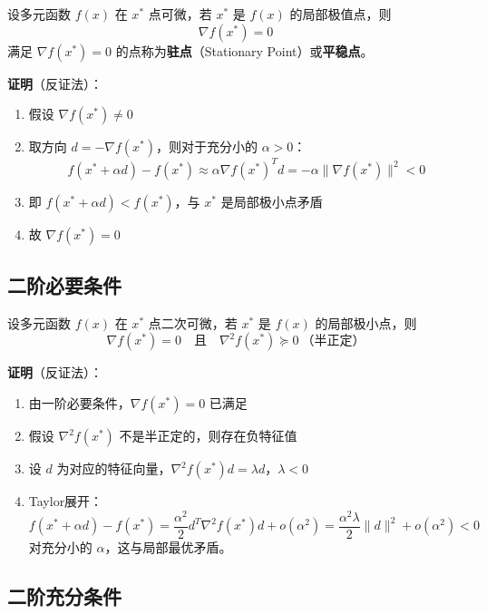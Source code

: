 \begin{theorem}[一阶必要条件]\label{thm:first-order}
设多元函数 $f(x)$ 在 $x^*$ 点可微，若 $x^*$ 是 $f(x)$ 的局部极值点，则
\[
\nabla f(x^*) = 0
\]
满足 $\nabla f(x^*) = 0$ 的点称为\textbf{驻点}（Stationary Point）或\textbf{平稳点}。
\end{theorem}

\textbf{证明}（反证法）：
\begin{enumerate}[label=Step \arabic*:, leftmargin=2em]
    \item 假设 $\nabla f(x^*) \neq 0$
    \item 取方向 $d = -\nabla f(x^*)$，则对于充分小的 $\alpha > 0$：
    \[
    f(x^* + \alpha d) - f(x^*) \approx \alpha \nabla f(x^*)^T d = -\alpha \|\nabla f(x^*)\|^2 < 0
    \]
    \item 即 $f(x^* + \alpha d) < f(x^*)$，与 $x^*$ 是局部极小点矛盾
    \item 故 $\nabla f(x^*) = 0$
\end{enumerate}

\subsection{二阶必要条件}

\begin{theorem}[二阶必要条件]\label{thm:second-order-necessary}
设多元函数 $f(x)$ 在 $x^*$ 点二次可微，若 $x^*$ 是 $f(x)$ 的局部极小点，则
\[
\nabla f(x^*) = 0 \quad \text{且} \quad \nabla^2 f(x^*) \succeq 0 \ \text{（半正定）}
\]
\end{theorem}

\textbf{证明}（反证法）：
\begin{enumerate}[label=Step \arabic*:, leftmargin=2em]
    \item 由一阶必要条件，$\nabla f(x^*) = 0$ 已满足
    \item 假设 $\nabla^2 f(x^*)$ 不是半正定的，则存在负特征值
    \item 设 $d$ 为对应的特征向量，$\nabla^2 f(x^*) d = \lambda d$，$\lambda < 0$
    \item Taylor展开：
    \[
    f(x^* + \alpha d) - f(x^*) = \frac{\alpha^2}{2} d^T \nabla^2 f(x^*) d + o(\alpha^2) = \frac{\alpha^2 \lambda}{2} \|d\|^2 + o(\alpha^2) < 0
    \]
    对充分小的 $\alpha$，这与局部最优矛盾。
\end{enumerate}

\subsection{二阶充分条件}

